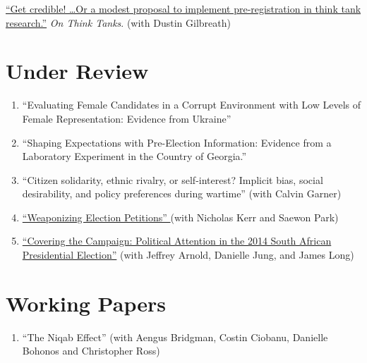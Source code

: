 \documentclass[margin,line]{res}
\begin{document}
{\begin{resume}
\begin{etaremune}

\href{https://onthinktanks.org/articles/get-credible-or-a-modest-proposal-to-implement-pre-registration-in-think-tank-research/}{``Get
credible! …Or a modest proposal to implement pre-registration in think
tank research.''} \emph{On Think Tanks}. (with Dustin Gilbreath)
\end{etaremune}

\section{\sc Under Review}
\renewcommand{\labelenumi}{UR\theenumi.}

\begin{enumerate}

\item ``Evaluating Female Candidates in a Corrupt Environment with Low
Levels of Female Representation: Evidence from Ukraine''

\item ``Shaping Expectations with Pre-Election Information:
Evidence from a Laboratory Experiment in the Country of Georgia.''

\item ``Citizen solidarity, ethnic rivalry, or self-interest? Implicit bias,
social desirability, and policy preferences during wartime'' (with
Calvin Garner)



\item \href {10.31219/osf.io/tsmvz}{``Weaponizing Election Petitions'' }(with
  Nicholas Kerr and Saewon Park)

  \item\href{https://osf.io/preprints/socarxiv/af9jq/}{``Covering the Campaign: Political Attention in the 2014 South African
Presidential Election''} (with Jeffrey Arnold, Danielle Jung, and James Long)

\end{enumerate}


\section{\sc Working Papers}
\renewcommand{\labelenumi}{WP\theenumi.}

\begin{enumerate}

\item ``The Niqab Effect'' (with Aengus Bridgman, Costin Ciobanu, Danielle
Bohonos and Christopher Ross)


\end{enumerate}
\end{resume}}
\end{document}
